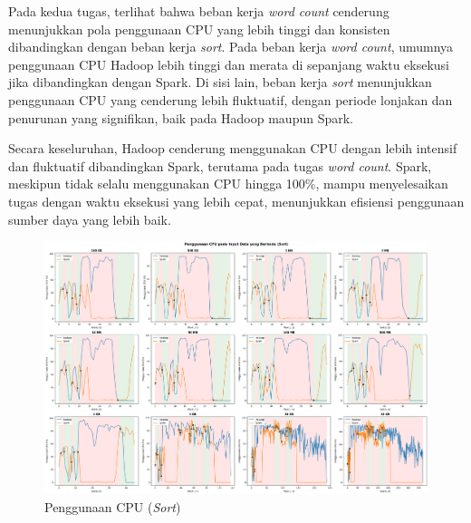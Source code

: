 \newpage
Pada kedua tugas, terlihat bahwa beban kerja \textit{word count} cenderung menunjukkan pola penggunaan CPU yang lebih tinggi dan konsisten dibandingkan dengan beban kerja \textit{sort}. Pada beban kerja \textit{word count}, umumnya penggunaan CPU Hadoop lebih tinggi dan merata di sepanjang waktu eksekusi jika dibandingkan dengan Spark. Di sisi lain, beban kerja \textit{sort} menunjukkan penggunaan CPU yang cenderung lebih fluktuatif, dengan periode lonjakan dan penurunan yang signifikan, baik pada Hadoop maupun Spark.

Secara keseluruhan, Hadoop cenderung menggunakan CPU dengan lebih intensif dan fluktuatif dibandingkan Spark, terutama pada tugas \textit{word count}. Spark, meskipun tidak selalu menggunakan CPU hingga 100\%, mampu menyelesaikan tugas dengan waktu eksekusi yang lebih cepat, menunjukkan efisiensi penggunaan sumber daya yang lebih baik.

\begin{landscape}
\begin{figure}[h]
    \centering
    \includegraphics[height=0.6\linewidth]{figures/ch04/4-penggunaan-cpu-all-sort.png}
    \caption{Penggunaan CPU (\textit{Sort})}
    \label{fig:4-penggunaan-cpu-all-sort}
\end{figure}
\end{landscape}

